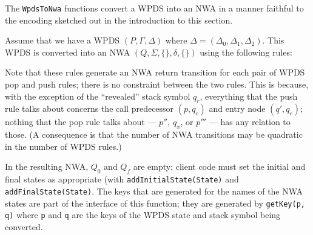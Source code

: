 The \texttt{WpdsToNwa} functions convert a WPDS into an NWA in a manner
faithful to the encoding sketched out in the introduction to this section.

Assume that we have a WPDS $(P, \Gamma, \Delta )$ 
where $\Delta = (\Delta_0, \Delta_1, \Delta_2)$. This 
WPDS is converted into an NWA $(Q,\Sigma,\{\},\delta,\{\})$ using the following rules:


Note that these rules generate an NWA return transition for each pair of WPDS pop
and push rules; there is no constraint between the two rules.  This is
because, with the exception of the ``revealed'' stack symbol $q_r$,
everything that the push rule talks about concerns the call predecessor
$(p,q_c)$ and entry node $(q', q_e)$; nothing that the pop rule talks about ---
$p''$, $q_x$, or $p'''$ --- has any relation to those. (A consequence is that the
number of NWA transitions may be quadratic in the number of
WPDS rules.)


In the resulting NWA, $Q_0$ and $Q_f$ are empty; client code must set the initial and
final states as appropriate (with \texttt{addInitialState(State)} and
\texttt{addFinalState(State)}. The keys that are generated for the names of the
NWA states are part of the interface of this function; they are generated by
\texttt{getKey(p, q)} where \texttt{p} and \texttt{q} are the keys of the
WPDS state and stack symbol being converted.


